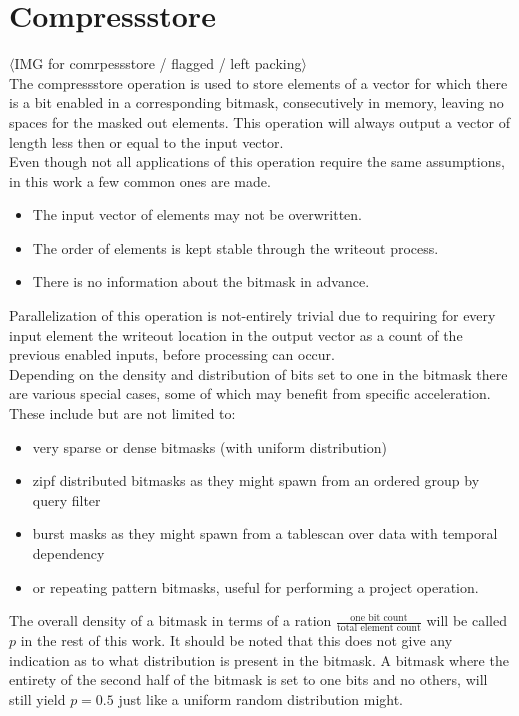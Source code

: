 \documentclass{tudscrreprt}
\newcommand{\markr}[1]{\textcolor{review}{$\langle$#1$\rangle$}}
\begin{document}
		\section{Compressstore}
			\markr{IMG for comrpessstore / flagged / left packing}\\
			The compressstore operation is used to store elements of a vector for which there is a bit enabled in a corresponding bitmask, consecutively in memory, leaving no spaces for the masked out elements. This operation will always output a vector of length less then or equal to the input vector. \\
			Even though not all applications of this operation require the same assumptions, in this work a few common ones are made.
			\begin{itemize}
				\item The input vector of elements may not be overwritten.
				\item The order of elements is kept stable through the writeout process.
				\item There is no information about the bitmask in advance.
			\end{itemize}
			Parallelization of this operation is not-entirely trivial due to requiring for every input element the writeout location in the output vector as a count of the previous enabled inputs, before processing can occur. \\
			Depending on the density and distribution of bits set to one in the bitmask there are various special cases, some of which may benefit from specific acceleration. \\
			These include but are not limited to:
			\begin{itemize}
				\item very sparse or dense bitmasks (with uniform distribution)
				\item zipf distributed bitmasks as they might spawn from an ordered group by query filter
				\item burst masks as they might spawn from a tablescan over data with temporal dependency
				\item or repeating pattern bitmasks, useful for performing a project operation.
			\end{itemize}
			The overall density of a bitmask in terms of a ration $\frac{\text{one bit count}}{\text{total element count}}$ will be called $p$ in the rest of this work. It should be noted that this does not give any indication as to what distribution is present in the bitmask. A bitmask where the entirety of the second half of the bitmask is set to one bits and no others, will still yield $p=0.5$ just like a uniform random distribution might. \\
		
\end{document}
